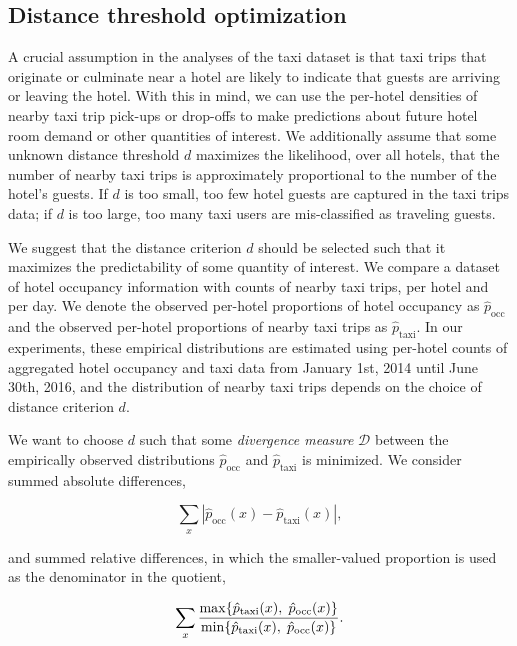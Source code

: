 \documentclass[useAMS, referee, usenatbib]{biom}
\begin{document}
\subsection{Distance threshold optimization}
\label{ss:distance_opt}

A crucial assumption in the analyses of the taxi dataset is that taxi trips that originate or culminate near a hotel are likely to indicate that guests are arriving or leaving the hotel. With this in mind, we can use the per-hotel densities of nearby taxi trip pick-ups or drop-offs to make predictions about future hotel room demand or other quantities of interest. We additionally assume that some unknown distance threshold $d$ maximizes the likelihood, over all hotels, that the number of nearby taxi trips is approximately proportional to the number of the hotel's guests. If $d$ is too small, too few hotel guests are captured in the taxi trips data; if $d$ is too large, too many taxi users are mis-classified as traveling guests.

We suggest that the distance criterion $d$ should be selected such that it maximizes the predictability of some quantity of interest. We compare a dataset of hotel occupancy information with counts of nearby taxi trips, per hotel and per day. We denote the observed per-hotel proportions of hotel occupancy as $\hat{p}_{\mathrm{occ}}$ and the observed per-hotel proportions of nearby taxi trips as $\hat{p}_{\mathrm{taxi}}$. In our experiments, these empirical distributions are estimated using per-hotel counts of aggregated hotel occupancy and taxi data from January 1st, 2014 until June 30th, 2016, and the distribution of nearby taxi trips depends on the choice of distance criterion $d$.

We want to choose $d$ such that some \textit{divergence measure} $\mathcal{D}$ between the empirically observed distributions $\hat{p}_{\mathrm{occ}}$ and $\hat{p}_{\mathrm{taxi}}$ is minimized. We consider summed absolute differences,

$$\sum_x | \hat{p}_{\mathrm{occ}} (x) - \hat{p}_{\mathrm{taxi}} (x) |,$$

and summed relative differences, in which the smaller-valued proportion is used as the denominator in the quotient,

$$\sum_x \frac{\max \{ \hat{p}_{\mathrm{taxi}} (x), \hspace*{0.1cm} \hat{p}_{\mathrm{occ}} (x) \}}{\min \{ \hat{p}_{\mathrm{taxi}} (x), \hspace*{0.1cm} \hat{p}_{\mathrm{occ}} (x) \}}.$$
\end{document}
